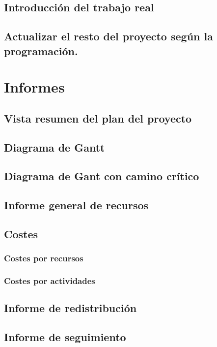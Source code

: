 \documentclass[11pt,a4paper,spanish,twoside]{report}
\begin{document}
\section{Introducción del trabajo real}

\section{Actualizar el resto del proyecto según la programación.}

\chapter{Informes}
\section{Vista resumen del plan del proyecto}

\section{Diagrama de Gantt}

\section{Diagrama de Gant con camino crítico}

\section{Informe general de recursos}

\section{Costes}
\subsection{Costes por recursos}
\subsection{Costes por actividades}

\section{Informe de redistribución}

\section{Informe de seguimiento}


 

\end{document}
